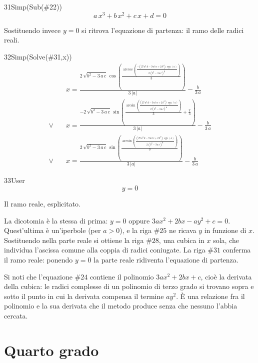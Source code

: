 \begin{espr}{31}{Simp(Sub(\#22))}{}
\[
a\, x^{3} + b\, x^{2} + c\, x + d = 0
\]
\end{espr}
Sostituendo invece $y=0$ si ritrova l'equazione di partenza: il ramo delle radici reali.

\begin{espr}{32}{Simp(Solve(\#31,x))}{}
\begin{align*}
& x = \frac{2\, \sqrt{b^{2} - 3\, a\, c}\, \cos\!\left(\frac{\arccos\!\left(\frac{-\left(27\, a^{2}\, d - 9\, a\, b\, c + 2\, b^{3}\right)\, \operatorname{sgn}\!\left(a\right)}{2\, \left(b^{2} - 3\, a\, c\right)^{\frac{3}{2}}}\right)}{3}\right)}{3\, \left|a\right|} - \frac{b}{3\, a} \\[3pt]
\lor\quad & x = \frac{-2\, \sqrt{b^{2} - 3\, a\, c}\, \sin\!\left(\frac{\arcsin\!\left(\frac{\left(27\, a^{2}\, d - 9\, a\, b\, c + 2\, b^{3}\right)\, \operatorname{sgn}\!\left(a\right)}{2\, \left(b^{2} - 3\, a\, c\right)^{\frac{3}{2}}}\right)}{3} + \frac{\pi}{3}\right)}{3\, \left|a\right|} - \frac{b}{3\, a} \\[3pt]
\lor\quad & x = \frac{2\, \sqrt{b^{2} - 3\, a\, c}\, \sin\!\left(\frac{\arcsin\!\left(\frac{\left(27\, a^{2}\, d - 9\, a\, b\, c + 2\, b^{3}\right)\, \operatorname{sgn}\!\left(a\right)}{2\, \left(b^{2} - 3\, a\, c\right)^{\frac{3}{2}}}\right)}{3}\right)}{3\, \left|a\right|} - \frac{b}{3\, a}
\end{align*}
\end{espr}
\begin{espr}{33}{User}{}
\[
y = 0
\]
\end{espr}
Il ramo reale, esplicitato.


La dicotomia è la stessa di prima: $y=0$ oppure $3ax^2+2bx-ay^2+c=0$. Quest'ultima è un'iperbole (per $a>0$), e la riga $\#25$ ne ricava $y$ in funzione di $x$. Sostituendo nella parte reale si ottiene la riga $\#28$, una cubica in $x$ sola, che individua l'ascissa comune alla coppia di radici coniugate. La riga $\#31$ conferma il ramo reale: ponendo $y=0$ la parte reale ridiventa l'equazione di partenza.

Si noti che l'equazione $\#24$ contiene il polinomio $3ax^2+2bx+c$, cioè la derivata della cubica: le radici complesse di un polinomio di terzo grado si trovano sopra e sotto il punto in cui la derivata compensa il termine $ay^2$. È una relazione fra il polinomio e la sua derivata che il metodo produce senza che nessuno l'abbia cercata.

\section{Quarto grado}


